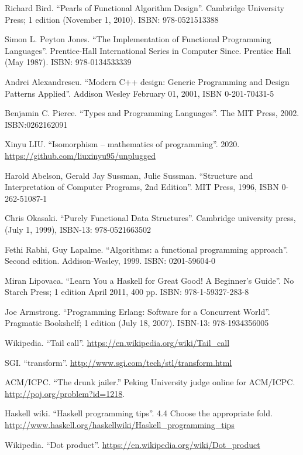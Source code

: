 \documentclass[b5paper]{article}
\begin{document}
\begin{thebibliography}{99}

Richard Bird. ``Pearls of Functional Algorithm Design''. Cambridge University Press; 1 edition (November 1, 2010). ISBN: 978-0521513388

Simon L. Peyton Jones. ``The Implementation of Functional Programming Languages''. Prentice-Hall International Series in Computer Since. Prentice Hall (May 1987). ISBN: 978-0134533339

Andrei Alexandrescu. ``Modern C++ design: Generic Programming and Design Patterns Applied''. Addison Wesley February 01, 2001, ISBN 0-201-70431-5

Benjamin C. Pierce. ``Types and Programming Languages''. The MIT Press, 2002. ISBN:0262162091

Xinyu LIU. ``Isomorphism -- mathematics of programming''. 2020. \url{https://github.com/liuxinyu95/unplugged}

Harold Abelson, Gerald Jay Sussman, Julie Sussman. ``Structure and Interpretation of Computer Programs, 2nd Edition''. MIT Press, 1996, ISBN 0-262-51087-1

Chris Okasaki. ``Purely Functional Data Structures''. Cambridge university press, (July 1, 1999), ISBN-13: 978-0521663502

Fethi Rabhi, Guy Lapalme. ``Algorithms: a functional programming approach''. Second edition. Addison-Wesley, 1999. ISBN: 0201-59604-0

Miran Lipovaca. ``Learn You a Haskell for Great Good! A Beginner's Guide''. No Starch Press; 1 edition April 2011, 400 pp. ISBN: 978-1-59327-283-8

Joe Armstrong. ``Programming Erlang: Software for a Concurrent World''. Pragmatic Bookshelf; 1 edition (July 18, 2007). ISBN-13: 978-1934356005

Wikipedia. ``Tail call''. \url{https://en.wikipedia.org/wiki/Tail_call}

SGI. ``transform''. \url{http://www.sgi.com/tech/stl/transform.html}

ACM/ICPC. ``The drunk jailer.'' Peking University judge online for ACM/ICPC. \url{http://poj.org/problem?id=1218}.

Haskell wiki. ``Haskell programming tips''. 4.4 Choose the appropriate fold. \url{http://www.haskell.org/haskellwiki/Haskell_programming_tips}

Wikipedia. ``Dot product''. \url{https://en.wikipedia.org/wiki/Dot_product}

\end{thebibliography}

\expandafter\enddocument
\fi
\end{document}
